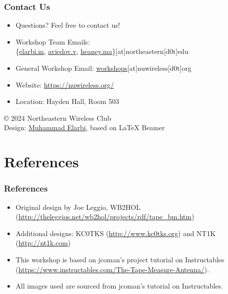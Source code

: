\documentclass{beamer}
\begin{document}
\begin{frame}
    \frametitle{Contact Us}
    \begin{itemize}
        \item Questions? Feel free to contact us!
        \item Workshop Team Emails: \\
        \{\href{mailto:elarbi.m@northeastern.edu}{elarbi.m}, 
        \href{mailto:aviedov.v@northeastern.edu}{aviedov.v}, 
        \href{mailto:heaney.ma@northeastern.edu}{heaney.ma}\}[at]northeastern[d0t]edu
        \item General Workshop Email: \href{mailto:workshops@nuwireless.org}{workshops}[at]nuwireless[d0t]org
        \item Website: \url{https://nuwireless.org/}
        \item Location: Hayden Hall, Room 503
    \end{itemize}
    \vspace{1cm}
    \begin{flushright}
        \footnotesize{© 2024 Northeastern Wireless Club} \\
        \footnotesize{Design: \href{https://melarbi.com}{Muhammad Elarbi}, based on LaTeX Beamer}
    \end{flushright}
\end{frame}

\section{References} 
\begin{frame} 
    \frametitle{References} 
    \begin{itemize} 
        \item Original design by Joe Leggio, WB2HOL (\url{http://theleggios.net/wb2hol/projects/rdf/tape_bm.htm}) 
        \item Additional designs: KC0TKS (\url{http://www.kc0tks.org}) and NT1K (\url{http://nt1k.com}) 
        \item This workshop is based on jcoman’s project tutorial on Instructables (\url{https://www.instructables.com/The-Tape-Measure-Antenna/}).
        \item All images used are sourced from jcoman’s tutorial on Instructables.
    \end{itemize}
\end{frame}
\end{document}
